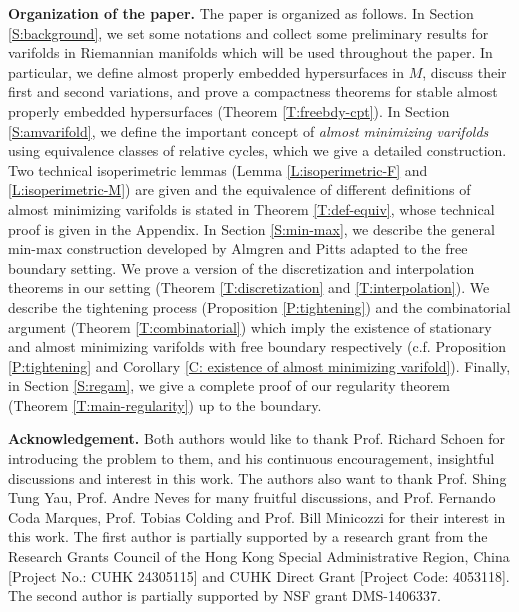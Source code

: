\documentclass[10pt]{amsart}
\theoremstyle{definition}
\theoremstyle{remark}
\numberwithin{equation}{section}
\begin{document}
\vspace{1em}

\noindent \textbf{Organization of the paper.} The paper is organized as follows. In Section \ref{S:background}, we set some notations and collect some preliminary results for varifolds in Riemannian manifolds which will be used throughout the paper. In particular, we define almost properly embedded hypersurfaces in $M$, discuss their first and second variations, and prove a compactness theorems for stable almost properly embedded hypersurfaces (Theorem \ref{T:freebdy-cpt}).
In Section \ref{S:amvarifold}, we define the important concept of \emph{almost minimizing varifolds} using equivalence classes of relative cycles, which we give a detailed construction. Two technical isoperimetric lemmas (Lemma \ref{L:isoperimetric-F} and \ref{L:isoperimetric-M}) are given and the equivalence of different definitions of almost minimizing varifolds is stated in Theorem \ref{T:def-equiv}, whose technical proof is given in the Appendix. In Section \ref{S:min-max}, we describe the general min-max construction developed by Almgren and Pitts adapted to the free boundary setting. We prove a version of the discretization and interpolation theorems in our setting (Theorem \ref{T:discretization} and \ref{T:interpolation}). We describe the tightening process (Proposition \ref{P:tightening}) and the combinatorial argument (Theorem \ref{T:combinatorial}) which imply the existence of stationary and almost minimizing varifolds with free boundary respectively (c.f. Proposition \ref{P:tightening} and Corollary \ref{C: existence of almost minimizing varifold}). Finally, in Section \ref{S:regam}, we give a complete proof of our regularity theorem (Theorem \ref{T:main-regularity}) up to the boundary.

\vspace{1em}
\textbf{Acknowledgement.} 
Both authors would like to thank Prof. Richard Schoen for introducing the problem to them, and his continuous encouragement, insightful discussions and interest in this work. 
The authors also want to thank Prof. Shing Tung Yau, Prof. Andre Neves for many fruitful discussions, and Prof. Fernando Coda Marques, Prof. Tobias Colding and Prof. Bill Minicozzi for their interest in this work. The first author is partially supported by a research grant from the Research Grants Council of the Hong Kong Special Administrative Region, China [Project No.: CUHK 24305115] and CUHK Direct Grant [Project Code: 4053118]. The second author is partially supported by  NSF grant DMS-1406337.
\end{document}
